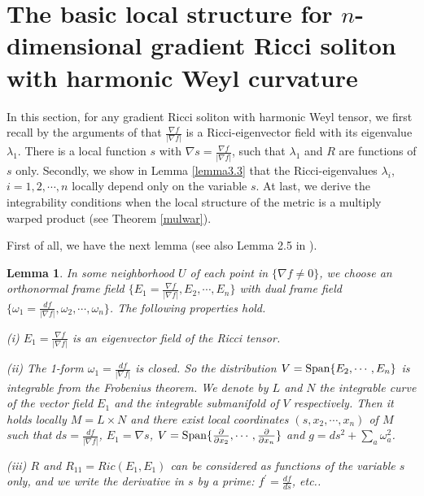 \documentclass{amsart}
\newtheorem{lemma}[theorem]{Lemma}
\theoremstyle{definition}
\theoremstyle{remark}
\numberwithin{equation}{section}
\begin{document}
	\section{The basic local structure for $n$-dimensional gradient Ricci soliton with harmonic Weyl curvature}
	In this section, for any gradient Ricci soliton with harmonic Weyl tensor, 
	we first recall by the arguments of \cite{CC2,Kim} that 
	$\frac{\nabla f}{ | \nabla f | }$ is a Ricci-eigenvector field with its eigenvalue $\lambda_1$.
	There is a local function $s$ with $\nabla s =\frac{\nabla f}{ | \nabla f | }$, 
	such that $\lambda_1$ and $R$ are functions of $s$ only.
	Secondly, we show in Lemma \ref{lemma3.3} that
	the Ricci-eigenvalues $\lambda_i$, $i=1,2,\cdots, n$ locally depend only on the variable $s$.
	At last, we derive the integrability conditions when the local structure of the metric is a multiply warped product (see Theorem \ref{mulwar}).
	
	First of all, we have the next lemma (see also Lemma 2.5 in \cite{Kim}).
	
	\begin{lemma} \label{lemma3.1}
		In some neighborhood $U$ of each point in $\{ \nabla f \neq 0  \}$, 
		we choose an orthonormal frame field
		$\{E_1= \frac{\nabla f}{|\nabla f| }, E_2, \cdots,  E_n \}$ 
		with dual frame field $\{\omega_1= \frac{d f}{|\nabla f| }, \omega_2, \cdots, \omega_n\}$.
		The following properties hold.
		
		\smallskip
		{\rm (i)} $E_1= \frac{\nabla f }{|\nabla f | }$ is an eigenvector field of the Ricci tensor.
		
		\smallskip
		{\rm (ii)} The 1-form $\omega_1= \frac{d f}{|\nabla f| }$ is closed. So the distribution
		$V={\rm Span}\{E_2, \cdots , E_n\}$ 
		is integrable from the Frobenius theorem. 
		We denote by $L$ and $N$ the integrable curve of the vector field $E_1$ and the integrable submanifold of $V$ respectively.
		Then it holds locally $M=L\times N$ 
		and there exist local coordinates $(s, x_2, \cdots , x_n)$ of $M$ such that 
		$ ds= \frac{d f}{|\nabla f|}$,  $E_1 = \nabla s$,
		$V={\rm Span} \{\frac{\partial}{\partial x_2}, \cdots , \frac{\partial}{\partial x_n}\} $
		and
		$g=ds^2+\sum_{a}\omega_a^2$.
		
		\smallskip
		{\rm (iii)} $R$ and $R_{11}= Ric (E_1, E_1)$ 
		can be considered as functions of the variable $s$ only, 
		and we write the derivative in $s$ by a prime: 
		$f^{'} = \frac{df}{ds}$, etc..
	\end{lemma}
	
\end{document}
